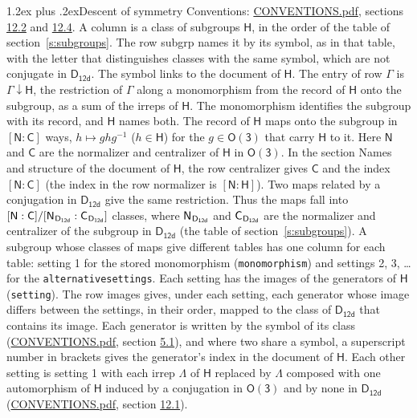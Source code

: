 \documentclass[10pt,a4paper]{article}
\makeatletter
\renewcommand\section{\@startsection{section}{1}{\z@}{-3ex plus -1ex minus -.2ex}%
  {1.2ex plus .2ex}{\normalfont\large\sffamily\bfseries\color{parttitle}}}
\numberwithin{equation}{section}
\newcommand{\grp}[1]{\mathsf{#1}}
\newcommand{\grpindex}[2]{[#1 : #2]}
\newcommand{\restr}[2]{#1\!\downarrow#2}
\newcommand{\hairsp}{\mkern1mu}
\makeatother
\begin{document}
\section{Descent of symmetry}\label{s:subduction}
Conventions: \href{../../CONVENTIONS.pdf}{CONVENTIONS.pdf}, sections \href{../../CONVENTIONS.pdf\#conv.12.2}{12.2} and \href{../../CONVENTIONS.pdf\#conv.12.4}{12.4}.
A column is a class of subgroups $\grp{H}$, in the order of the table of section~\ref{s:subgroups}. The row subgrp names it by its symbol, as in that table, with the letter that distinguishes classes with the same symbol, which are not conjugate in $\grp{D_{12d}}$. The symbol links to the document of $\grp{H}$. The entry of row $\Gamma$ is $\restr{\Gamma}{\grp{H}}$, the restriction of $\Gamma$ along a monomorphism from the record of $\grp{H}$ onto the subgroup, as a sum of the irreps of $\grp{H}$. The monomorphism identifies the subgroup with its record, and $\grp{H}$ names both. \label{n:group.normalizer.o3}\label{n:group.centralizer.o3}The record of $\grp{H}$ maps onto the subgroup in $\grpindex{\grp{N}}{\grp{C}}$ ways, $h \mapsto g h g^{-1}$ ($h \in \grp{H}$) for the $g \in \grp{O(3)}$ that carry $\grp{H}$ to it. Here $\grp{N}$ and $\grp{C}$ are the normalizer and centralizer of $\grp{H}$ in \href{O3.pdf}{$\grp{O(3)}$}. In the section Names and structure of the document of $\grp{H}$, the row centralizer gives $\grp{C}$ and the index $\grpindex{\grp{N}}{\grp{C}}$ (the index in the row normalizer is $\grpindex{\grp{N}}{\grp{H}}$). Two maps related by a conjugation in $\grp{D_{12d}}$ give the same restriction. Thus the maps fall into $\grpindex{\grp{N}}{\grp{C}}/\grpindex{\grp{N}_{\hairsp \grp{D_{12d}}}}{\grp{C}_{\hairsp \grp{D_{12d}}}}$ classes, where $\grp{N}_{\hairsp \grp{D_{12d}}}$ and $\grp{C}_{\hairsp \grp{D_{12d}}}$ are the normalizer and centralizer of the subgroup in $\grp{D_{12d}}$ (the table of section~\ref{s:subgroups}). \label{n:head.setting}A subgroup whose classes of maps give different tables has one column for each table: setting 1 for the stored monomorphism (\texttt{monomorphism}) and settings 2, 3, \dots{} for the \texttt{alternativesettings}. Each setting has the images of the generators of $\grp{H}$ (\texttt{setting}). \label{n:head.images}The row images gives, under each setting, each generator whose image differs between the settings, in their order, mapped to the class of $\grp{D_{12d}}$ that contains its image. \label{n:element.generator.index}Each generator is written by the symbol of its class (\href{../../CONVENTIONS.pdf}{CONVENTIONS.pdf}, section \href{../../CONVENTIONS.pdf\#conv.5.1}{5.1}), and where two share a symbol, a superscript number in brackets gives the generator's index in the document of $\grp{H}$. \label{n:irrep.Delta}Each other setting is setting 1 with each irrep $\Lambda$ of $\grp{H}$ replaced by $\Lambda$ composed with one automorphism of $\grp{H}$ induced by a conjugation in \href{O3.pdf}{$\grp{O(3)}$} and by none in $\grp{D_{12d}}$ (\href{../../CONVENTIONS.pdf}{CONVENTIONS.pdf}, section \href{../../CONVENTIONS.pdf\#conv.12.1}{12.1}).
\end{document}
